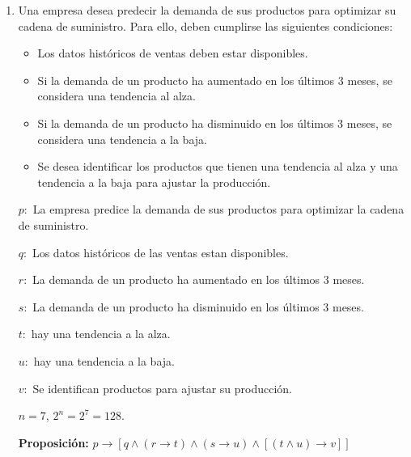 \documentclass[12pt]{article}
\begin{document}
\begin{itemize}
\begin{enumerate}
                \newpage
                \item Una empresa desea predecir la demanda de sus productos para optimizar su cadena de suministro. Para ello, deben cumplirse las siguientes condiciones:
                    \begin{itemize}
                        \item Los datos históricos de ventas deben estar disponibles.
                        \item Si la demanda de un producto ha aumentado en los últimos 3 meses, se considera una tendencia al alza.
                        \item Si la demanda de un producto ha disminuido en los últimos 3 meses, se considera una tendencia a la baja.
                        \item Se desea identificar los productos que tienen una tendencia al alza y una tendencia a la baja para ajustar la producción.
                    \end{itemize}
                    \par$p:$ La empresa predice la demanda de sus productos para optimizar la cadena de suministro.
                    \par$q:$ Los datos históricos de las ventas estan disponibles.
                    \par$r:$ La demanda de un producto ha aumentado en los últimos 3 meses.
                    \par$s:$ La demanda de un producto ha disminuido en los últimos 3 meses.
                    \par$t:$ hay una tendencia a la alza.
                    \par$u:$ hay una tendencia a la baja.
                    \par$v:$ Se identifican productos para ajustar su producción.
                    \par$n = 7$, $2^n = 2^7 = 128.$ \vspace{0.5cm}
                    \par\textbf{Proposición: }$p \longrightarrow [q \wedge (r \longrightarrow t) \wedge (s \longrightarrow u) \wedge [(t \wedge u) \longrightarrow v]]$\vspace{0.5cm}


\end{enumerate}
\end{itemize}
\end{document}
